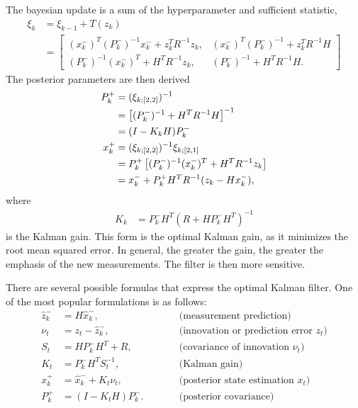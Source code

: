 The bayesian update is a sum of the hyperparameter and sufficient statistic,
\begin{align}
    \xi_{k}
    &= \xi_{k-1} +  T(z_{k})  \nonumber \\
    &=
    \begin{bmatrix}
    (x_{k}^{-})^{T} (P_{k}^{-})^{-1} x_{k}^{-} + z_{k}^{T} R^{-1} z_{k},
    & (x_{k}^{-})^{T} (P_{k}^{-})^{-1} + z_{k}^{T} R^{-1} H \\
    (P_{k}^{-})^{-1} (x_{k}^{-})^{T} + H^{T} R^{-1} z_{k},
    & (P_{k}^{-})^{-1} + H^{T} R^{-1} H.
    \end{bmatrix}
\end{align}
The posterior parameters are then derived
\begin{align}
    P_{k}^{+} &= (\xi_{k;[2,2]})^{-1} \notag\\
    &= \left[ (P_{k}^{-})^{-1} + H^{T} R^{-1} H \right]^{-1} \notag\\
    &= (I - K_{k} H) P_{k}^{-} \\
    x_{k}^{+} &= (\xi_{k;[2,2]})^{-1} \xi_{k;[2,1]} \notag\\
    &= P_{k}^{+} \left[ (P_{k}^{-})^{-1} (x_{k}^{-})^{T} + H^{T} R^{-1} z_{k}\right] \notag \\
    &= x_{k}^{-} + P_{k}^{+} H^{T} R^{-1}(z_{k} - Hx_{k}^{-}),
\end{align}
where
\begin{align}
    K_{k} &= P_{k}^{-} H^{T}(R + H P_{k}^{-}H^{T})^{-1} \label{eq:kalman_gain}
\end{align}
is the Kalman gain. This form is the optimal Kalman gain, as it minimizes the root mean squared error. In general, the
greater the gain, the greater the emphasis of the new measurements. The filter is then more sensitive.

There are several possible formulas that express the optimal Kalman filter. One of the most popular formulations is
as follows:
\begin{align}
    \hat{z}_{k}^{-} &= H \hat{x}_{k}^{-}, \qquad &&\text{(measurement prediction)} \\
    \nu_t &= z_t - \hat{z}_{k}^{-}, \qquad &&\text{(innovation or prediction error $z_t$)} \\
    S_t &= H P_{k}^{-} H^T + R, \qquad &&\text{(covariance of innovation $\nu_t$)} \\
    K_t &= P_{k}^{-} H^T S_t^{-1}, \qquad &&\text{(Kalman gain)} \\
    {x}_{k}^{+} &= \hat{x}_{k}^{-} + K_t \nu_t, \qquad &&\text{(posterior state estimation $x_t$)} \\
    P_{k}^{+} &= (I - K_t H) P_{k}^{-}. \qquad &&\text{(posterior covariance)}
\end{align}

